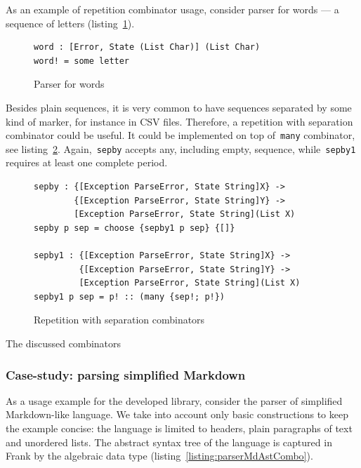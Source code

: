     As an example of repetition combinator usage, consider parser for words ---
    a sequence of letters (listing~\ref{listing:parserWordCombo}).

    \begin{figure}[h]
    \begin{lstlisting}
word : [Error, State (List Char)] (List Char)
word! = some letter
    \end{lstlisting}
    \caption{Parser for words}
    \label{listing:parserWordCombo}
    \end{figure}

    Besides plain sequences, it is very common to have sequences separated by some
    kind of marker, for instance in CSV files. Therefore, a repetition with separation
    combinator could be useful. It could be implemented on top of~\texttt{many}
    combinator, see listing~\ref{listing:parserSepbyCombo}. Again,~\texttt{sepby}
    accepts any, including empty, sequence, while~\texttt{sepby1} requires at least
    one complete period.

    \begin{figure}[h]
    \begin{lstlisting}
sepby : {[Exception ParseError, State String]X} ->
        {[Exception ParseError, State String]Y} ->
        [Exception ParseError, State String](List X)
sepby p sep = choose {sepby1 p sep} {[]}

sepby1 : {[Exception ParseError, State String]X} ->
         {[Exception ParseError, State String]Y} ->
         [Exception ParseError, State String](List X)
sepby1 p sep = p! :: (many {sep!; p!})
    \end{lstlisting}
    \caption{Repetition with separation combinators}
    \label{listing:parserSepbyCombo}
    \end{figure}

    The discussed combinators

    \subsubsection{Case-study: parsing simplified Markdown}

    As a usage example for the developed library, consider the
    parser of simplified Markdown-like language. We take into account only basic
    constructions to keep the example concise: the language is limited to headers,
    plain paragraphs of text and unordered lists. The abstract syntax tree of
    the language is captured in Frank by the algebraic data type
    (listing~\ref{listing:parserMdAstCombo}).

